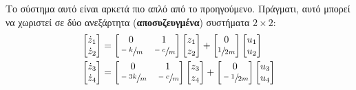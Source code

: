 \documentclass[11pt,a4paper,notitlepage,fleqn]{article}
\begin{document}
\begin{exercise}
	Το σύστημα αυτό είναι αρκετά πιο απλό από το προηγούμενο. Πράγματι,
	αυτό μπορεί να χωριστεί σε δύο ανεξάρτητα (\textbf{αποσυζευγμένα})
	συστήματα \( 2\times2 \):
	\begin{align*}
		\left[\begin{matrix}
		\dot z_1\\ \dot z_2
		\end{matrix}\right] &= \left[\begin{matrix}
		0 & 1 \\ \sfrac{-k}{m}  & \sfrac{-c}{m}
		\end{matrix}\right]\left[\begin{matrix}
		z_1\\z_2
		\end{matrix}\right] + \left[\begin{matrix}
		0 \\ \sfrac{1}{2m}
		\end{matrix}\right]\left[\begin{matrix}
		u_1 \\ u_2
		\end{matrix}\right] \\
		\left[\begin{matrix}
		\dot z_3\\ \dot z_4
		\end{matrix}\right] &= \left[\begin{matrix}
		0 & 1 \\ \sfrac{-3k}{m}  & \sfrac{-c}{m}
		\end{matrix}\right]\left[\begin{matrix}
		z_3\\z_4
		\end{matrix}\right] + \left[\begin{matrix}
		0 \\ \sfrac{-1}{2m}
		\end{matrix}\right]\left[\begin{matrix}
		u_3 \\ u_4
		\end{matrix}\right]
	\end{align*}


\end{exercise}
\end{document}

